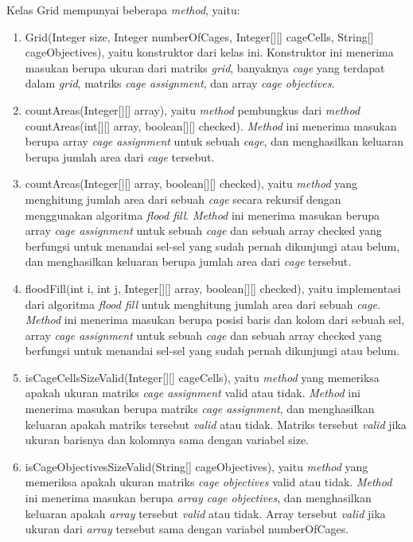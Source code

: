 Kelas Grid mempunyai beberapa \textit{method}, yaitu:

\begin{enumerate}
\item Grid(Integer size, Integer numberOfCages, Integer[][] cageCells, String[] cageObjectives), yaitu konstruktor dari kelas ini. Konstruktor ini menerima masukan berupa ukuran dari matriks \textit{grid}, banyaknya \textit{cage} yang terdapat dalam \textit{grid}, matriks \textit{cage assignment}, dan array \textit{cage objectives}.
\item countAreas(Integer[][] array), yaitu \textit{method} pembungkus dari \textit{method} countAreas(int[][] array, boolean[][] checked). \textit{Method} ini menerima masukan berupa array \textit{cage assignment} untuk sebuah \textit{cage}, dan menghasilkan keluaran berupa jumlah area dari \textit{cage} tersebut.
\item countAreas(Integer[][] array, boolean[][] checked), yaitu \textit{method} yang menghitung jumlah area dari sebuah \textit{cage} secara rekursif dengan menggunakan algoritma \textit{flood fill}. \textit{Method} ini menerima masukan berupa array \textit{cage assignment} untuk sebuah \textit{cage} dan sebuah array checked yang berfungsi untuk menandai sel-sel yang sudah pernah dikunjungi atau belum, dan menghasilkan keluaran berupa jumlah area dari \textit{cage} tersebut.
\item floodFill(int i, int j, Integer[][] array, boolean[][] checked), yaitu implementasi dari algoritma \textit{flood fill} untuk menghitung jumlah area dari sebuah \textit{cage}. \textit{Method} ini menerima masukan berupa posisi baris dan kolom dari sebuah sel, array \textit{cage assignment} untuk sebuah \textit{cage} dan sebuah array checked yang berfungsi untuk menandai sel-sel yang sudah pernah dikunjungi atau belum.
\item isCageCellsSizeValid(Integer[][] cageCells), yaitu \textit{method} yang memeriksa apakah ukuran matriks \textit{cage assignment} valid atau tidak. \textit{Method} ini menerima masukan berupa matriks \textit{cage assignment}, dan menghasilkan keluaran apakah matriks tersebut \textit{valid} atau tidak. Matriks tersebut \textit{valid} jika ukuran barisnya dan kolomnya sama dengan variabel size.
\item isCageObjectivesSizeValid(String[] cageObjectives), yaitu \textit{method} yang memeriksa apakah ukuran matriks \textit{cage objectives} valid atau tidak. \textit{Method} ini menerima masukan berupa \textit{array cage objectives}, dan menghasilkan keluaran apakah \textit{array} tersebut \textit{valid} atau tidak. Array tersebut \textit{valid} jika ukuran dari \textit{array} tersebut sama dengan variabel numberOfCages.

\end{enumerate}

